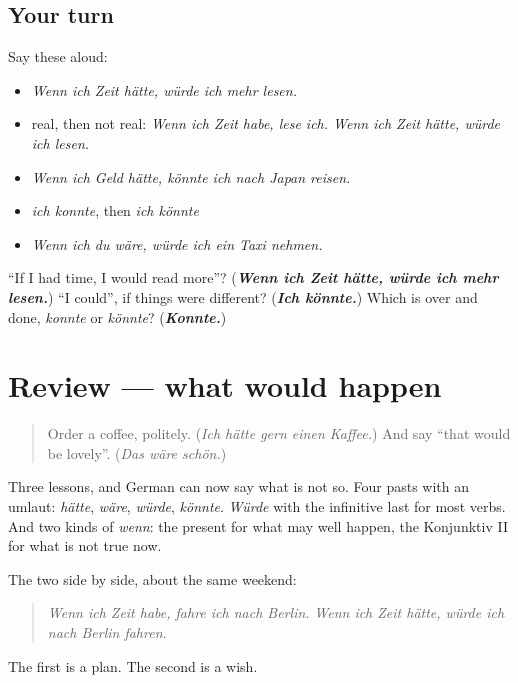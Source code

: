 \subsection*{Your turn}
Say these aloud:

\begin{itemize}
\raggedright
  \item \emph{Wenn ich Zeit hätte, würde ich mehr lesen.}
  \item real, then not real: \emph{Wenn ich Zeit habe, lese ich. Wenn ich Zeit hätte, würde ich lesen.}
  \item \emph{Wenn ich Geld hätte, könnte ich nach Japan reisen.}
  \item \emph{ich konnte}, then \emph{ich könnte}
  \item \emph{Wenn ich du wäre, würde ich ein Taxi nehmen.}
\end{itemize}

\begin{tcolorbox}[breakable,colback=teal!4,colframe=teal!35!black,title={Before you move on}]
\textquotedblleft{}If I had time, I would read more\textquotedblright{}? (\emph{\textbf{Wenn ich Zeit hätte, würde ich mehr lesen.}}) \textquotedblleft{}I could\textquotedblright{}, if things were different? (\emph{\textbf{Ich könnte.}}) Which is over and done, \emph{konnte} or \emph{könnte}? (\emph{\textbf{Konnte.}})
\end{tcolorbox}
\section[(review)]{Review — what would happen}

\label{lesson:GE-C261-review}



\begin{quote}
Order a coffee, politely. (\emph{Ich hätte gern einen Kaffee.}) And say \textquotedblleft{}that would be lovely\textquotedblright{}. (\emph{Das wäre schön.})
\end{quote}

\begin{grammarlens}[title={What you've built}]
Three lessons, and German can now say what is not so. Four pasts with an umlaut: \emph{hätte}, \emph{wäre}, \emph{würde}, \emph{könnte}. \emph{Würde} with the infinitive last for most verbs. And two kinds of \emph{wenn}: the present for what may well happen, the Konjunktiv II for what is not true now.

The two side by side, about the same weekend:

\begin{quote}
\emph{Wenn ich Zeit habe, fahre ich nach Berlin.} \emph{Wenn ich Zeit hätte, würde ich nach Berlin fahren.}
\end{quote}

The first is a plan. The second is a wish.
\end{grammarlens}

